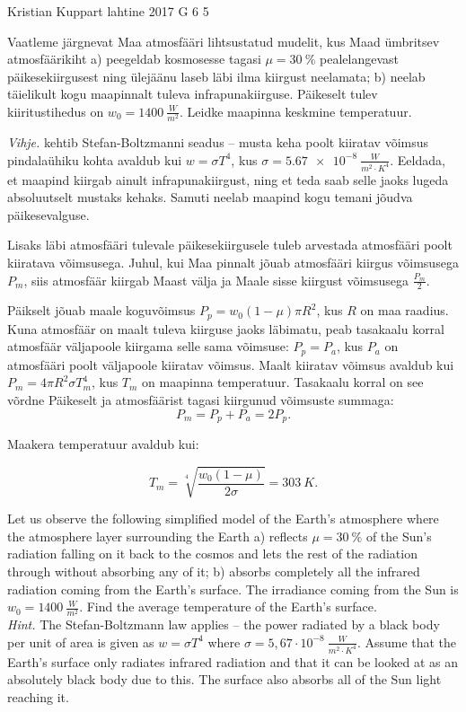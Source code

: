 {Kristian Kuppart} %
{lahtine} %
{2017} %
{G 6} %
{5} %
{
\ifStatement
Vaatleme järgnevat Maa atmosfääri lihtsustatud mudelit, kus Maad ümbritsev atmosfäärikiht a) peegeldab kosmosesse tagasi $\mu=\SI{30}{\%}$ pealelangevast päikesekiirgusest ning ülejäänu laseb läbi ilma kiirgust neelamata; b) neelab täielikult kogu maapinnalt tuleva infrapunakiirguse. Päikeselt tulev kiiritustihedus on $w_0=\SI{1400}{\frac{W}{m^2}}$.  Leidke maapinna keskmine temperatuur.

\textit{Vihje.} kehtib Stefan-Boltzmanni seadus -- musta keha poolt kiiratav võimsus pindalaühiku kohta avaldub kui $w=\sigma T^4$, kus $\sigma=\SI{5.67e-8}{\frac{W}{m^2 \cdot K^4}}$. Eeldada, et maapind kiirgab ainult infrapunakiirgust, ning et teda saab selle jaoks lugeda absoluutselt mustaks kehaks. Samuti neelab maapind kogu temani jõudva päikesevalguse.
\fi


\ifHint
Lisaks läbi atmosfääri tulevale päikesekiirgusele tuleb arvestada atmosfääri poolt kiiratava võimsusega. Juhul, kui Maa pinnalt jõuab atmosfääri kiirgus võimsusega $P_m$, siis atmosfäär kiirgab Maast välja ja Maale sisse kiirgust võimsusega $\frac{P_m}{2}$.
\fi


\ifSolution
Päikselt jõuab maale koguvõimsus $P_p=w_0 \left(1-\mu\right)\pi R^2$, kus $R$ on maa raadius. Kuna atmosfäär on maalt tuleva kiirguse jaoks läbimatu, peab tasakaalu korral atmosfäär väljapoole kiirgama selle sama võimsuse: $P_p=P_a$, kus $P_a$ on atmosfääri poolt väljapoole kiiratav võimsus. Maalt kiiratav võimsus avaldub kui $P_m=4 \pi R^2 \sigma T_m^4$, kus $T_m$ on maapinna temperatuur. Tasakaalu korral on see võrdne Päikeselt ja atmosfäärist tagasi kiirgunud võimsuste summaga:
\[P_m=P_p+P_a=2P_p.\]

Maakera temperatuur avaldub kui:

\[T_m=\sqrt[4]{\frac{w_0\left(1-\mu\right)}{2\sigma}}=\SI{303}{K}.\]
\fi


\ifEngStatement
Let us observe the following simplified model of the Earth’s atmosphere where the atmosphere layer surrounding the Earth a) reflects $\mu=\SI{30}{\%}$ of the Sun’s radiation falling on it back to the cosmos and lets the rest of the radiation through without absorbing any of it; b) absorbs completely all the infrared radiation coming from the Earth’s surface. The irradiance coming from the Sun is $w_0=\SI{1400}{\frac{W}{m^2}}$. Find the average temperature of the Earth’s surface.\\
\emph{Hint.} The Stefan-Boltzmann law applies – the power radiated by a black body per unit of area is given as $w=\sigma T^4$ where $\sigma =5,67 \cdot 10^{-8} \SI{}{\frac{W}{m^2 \cdot K^4}}$. Assume that the Earth’s surface only radiates infrared radiation and that it can be looked at as an absolutely black body due to this. The surface also absorbs all of the Sun light reaching it.
\fi


}

